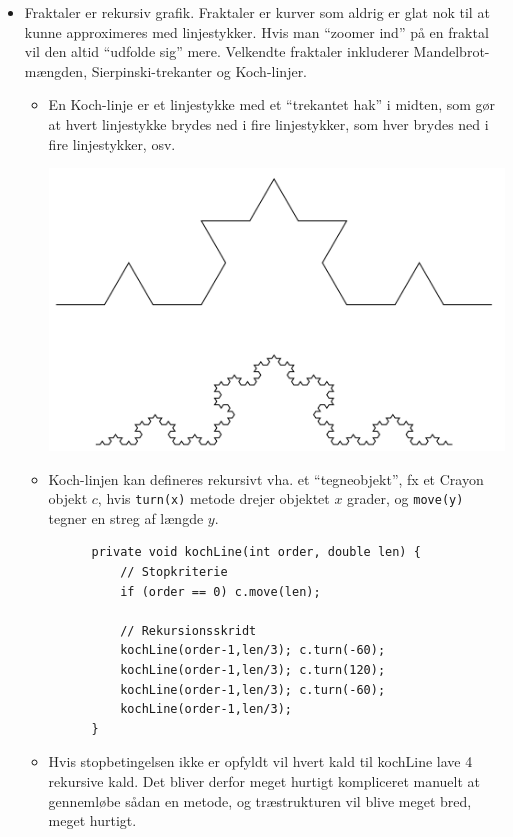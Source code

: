 \begin{itemize}
  \item Fraktaler er rekursiv grafik. Fraktaler er kurver som aldrig er glat nok til at kunne approximeres med linjestykker. Hvis man “zoomer ind” på en fraktal vil den altid “udfolde sig” mere. Velkendte fraktaler inkluderer Mandelbrot-mængden, Sierpinski-trekanter og Koch-linjer.
  \begin{itemize}
    \item En Koch-linje er et linjestykke med et “trekantet hak” i midten, som gør at hvert linjestykke brydes ned i fire linjestykker, som hver brydes ned i fire linjestykker, osv.
    
    \begin{center}
      \includegraphics[scale=0.7]{images/koch_line.png}
    \end{center}
    
    \item Koch-linjen kan defineres rekursivt vha. et “tegneobjekt”, fx et Crayon objekt $c$, hvis \verb|turn(x)| metode drejer objektet $x$ grader, og \verb|move(y)| tegner en streg af længde $y$.
    \begin{verbatim}
      private void kochLine(int order, double len) {
          // Stopkriterie
          if (order == 0) c.move(len);
        
          // Rekursionsskridt
          kochLine(order-1,len/3); c.turn(-60);
          kochLine(order-1,len/3); c.turn(120);
          kochLine(order-1,len/3); c.turn(-60);
          kochLine(order-1,len/3);
      }
    \end{verbatim}
    \item Hvis stopbetingelsen ikke er opfyldt vil hvert kald til kochLine lave 4 rekursive kald. Det bliver derfor meget hurtigt kompliceret manuelt at gennemløbe sådan en metode, og træstrukturen vil blive meget bred, meget hurtigt.
  \end{itemize}
\end{itemize}

